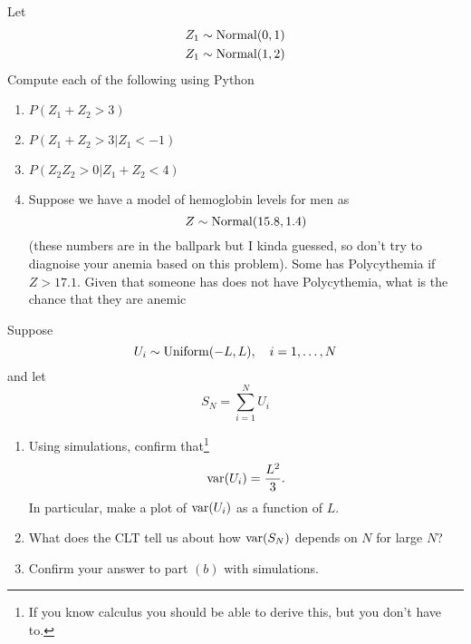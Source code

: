 \begin{exercise} Let
\begin{align*}
Z_1 &\sim {\rm Normal}(0,1)\\
Z_1 &\sim {\rm Normal}(1,2)
\end{align*} 
Compute each of the following using Python
\begin{enumerate}[label=(\alph*)]
\item $P(Z_1 + Z_2>3)$
\item $P(Z_1 + Z_2>3|Z_1<-1)$
\item $P(Z_2Z_2>0|Z_1+Z_2<4)$
\item Suppose we have a model of hemoglobin levels for men as 
\begin{equation*}
Z \sim {\rm Normal}(15.8,1.4)
\end{equation*}
(these numbers are in the ballpark but I kinda guessed, so don't try to diagnoise your anemia based on this problem). 
Some has Polycythemia if $Z>17.1$. Given that someone has does not have Polycythemia, what is the chance that they are anemic
\end{enumerate}
\end{exercise}



\begin{exercise}
Suppose 
\begin{equation*}
U_i \sim {\rm Uniform}(-L,L),\quad i=1,\dots,N
\end{equation*}
and let 
\begin{equation*}
S_N = \sum_{i=1}^N U_i
\end{equation*}
\begin{enumerate}[label=(\alph*)]
\item Using simulations, confirm that\footnote{If you know calculus you should be able to derive this, but you don't have to. }
\begin{equation*}
{\rm var}(U_i) = \frac{L^2}{3}.
\end{equation*}
In particular, make a plot of ${\rm var}(U_i)$ as a function of $L$. 
\item What does the CLT tell us about how ${\rm var}(S_N)$ depends on $N$ for large $N$? 
\item Confirm your answer to part $(b)$ with simulations. 
\end{enumerate}

\end{exercise}



